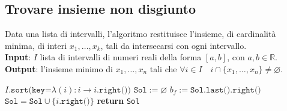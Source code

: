 \documentclass[14pt]{extreport}
\theoremstyle{definition}
\theoremstyle{definition}
\begin{document}
\subsection{Trovare insieme non disgiunto}

\begin{algorithm}[H]
    \caption{
        Data una lista di intervalli, l'algoritmo restituisce l'insieme, di cardinalità minima, di interi $x_1, \ldots, x_k$, tali da intersecarsi con ogni intervallo.\\
        \textbf{Input}: $I$ lista di intervalli di numeri reali della forma $[a, b]$, con $a, b \in \mathbb{R}$.\\
        \textbf{Output}: l'insieme minimo di $x_1, \ldots, x_n$ tali che $\forall i \in I \quad i \cap \{x_1, \ldots, x_n\} \neq \varnothing$.
    }

    \begin{algorithmic}[1]
            \State $I\texttt{.sort(key=}\lambda (i) : i \rightarrow i\texttt{.right())}$ 
            \State $\texttt{Sol}:= \varnothing$
                \State $b_f := \texttt{Sol.last().right()}$ 
                 
                    \State $\texttt{Sol} = \texttt{Sol} \cup \{i\texttt{.right()}\}$
                \EndIf
            \EndFor
            \State \textbf{return} \texttt{Sol}
        \EndFunction
    \end{algorithmic}
\end{algorithm}
\end{document}
